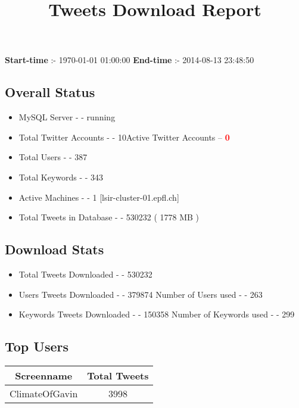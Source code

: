 \documentclass{article}\usepackage[T1]{fontenc}
\begin{document}
\title{\textbf{Tweets Download Report}}
               \date{}
                \maketitle
               \centerline{\textbf{Start-time} :- 1970-01-01 01:00:00 \hspace{40pt} \textbf{End-time} :- 2014-08-13 23:48:50}               \subsection*{Overall Status}                \begin{itemize}                \item MySQL Server - - running               \item Total Twitter Accounts - - 10\newline Active Twitter Accounts -- \textcolor{red}{\textbf{0}}               \item Total Users - - 387               \item Total Keywords - - 343               \item Active Machines - - 1 [lsir-cluster-01.epfl.ch]               \item Total Tweets in Database - - 530232 ( 1778 MB )               \end{itemize}               \subsection*{Download Stats}                \begin{itemize}                \item Total Tweets Downloaded - - 530232               \item Users Tweets Downloaded - - 379874 \newline Number of Users used - - 263               \item Keywords Tweets Downloaded - - 150358 \newline Number of Keywords used - - 299              \end{itemize}              \subsection*{Top Users}\begin{tabular}{|c|c|}         \hline         Screenname & Total Tweets \\ 
 \hline
ClimateOfGavin & 3998\\ 

\end{tabular}
\end{document}
